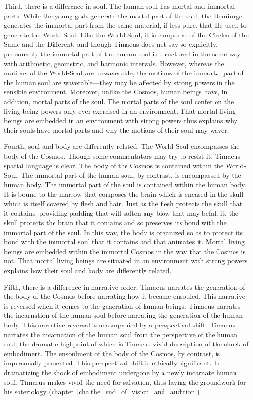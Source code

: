 Third, there is a difference in soul. The human soul has mortal and immortal parts. While the young gods generate the mortal part of the soul, the Demiurge generates the immortal part from the same material, if less pure, that He used to generate the World-Soul. Like the World-Soul, it is composed of the Circles of the Same and the Different, and though Timaeus does not say so explicitly, presumably the immortal part of the human soul is structured in the same way with arithmetic, geometric, and harmonic intervals. However, whereas the motions of the World-Soul are unwaverable, the motions of the immortal part of the human soul are waverable---they may be affected by strong powers in the sensible environment. Moreover, unlike the Cosmos, human beings have, in addition, mortal parts of the soul. The mortal parts of the soul confer on the living being powers only ever exercised in an environment. That mortal living beings are embedded in an environment with strong powers thus explains why their souls have mortal parts and why the motions of their soul may waver.

Fourth, soul and body are differently related. The World-Soul encompasses the body of the Cosmos. Though some commentators may try to resist it, Timaeus spatial language is clear. The body of the Cosmos is contained within the World-Soul. The immortal part of the human soul, by contrast, is encompassed by the human body. The immortal part of the soul is contained within the human body. It is bound to the marrow that composes the brain which is encased in the skull which is itself covered by flesh and hair. Just as the flesh protects the skull that it contains, providing padding that will soften any blow that may befall it, the skull protects the brain that it contains and so preserves its bond with the immortal part of the soul. In this way, the body is organized so as to protect its bond with the immortal soul that it contains and that animates it. Mortal living beings are embedded within the immortal Cosmos in the way that the Cosmos is not. That mortal living beings are situated in an environment with strong powers explains how their soul and body are differently related.

Fifth, there is a difference in narrative order. Timaeus narrates the generation of the body of the Cosmos before narrating how it became ensouled. This narrative is reversed when it comes to the generation of human beings. Timaeus narrates the incarnation of the human soul before narrating the generation of the human body. This narrative reversal is accompanied by a perspectival shift. Timaeus narrates the incarnation of the human soul from the perspective of the human soul, the dramatic highpoint of which is Timaeus vivid description of the shock of embodiment. The ensoulment of the body of the Cosmos, by contrast, is impersonally presented. This perspectival shift is ethically significant. In dramatizing the shock of embodiment undergone by a newly incarnate human soul, Timaeus makes vivid the need for salvation, thus laying the groundwork for his soteriology (chapter~\ref{cha:the_end_of_vision_and_audition}).

